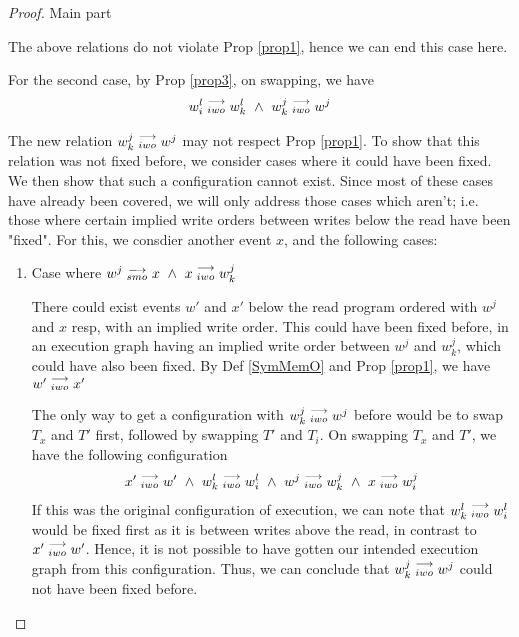 \begin{proof}{Main part}
\begin{itemize}
                        The above relations do not violate Prop \ref{prop1}, hence we can end this case here. 

                        For the second case, by Prop \ref{prop3}, on swapping, we have 
                        \begin{align*}
                            \reln{w_i^l}{iwo}{w_k^l} \ \wedge \ \reln{w_k^j}{iwo}{w^j}
                        \end{align*}

                        The new relation $w_k^j\stackrel{\longrightarrow}{_{iwo}}w^j$ may not respect Prop \ref{prop1}. 
                        To show that this relation was not fixed before, we consider cases where it could have been fixed. We then show that such a configuration cannot exist. Since most of these cases have already been covered, we will only address those cases which aren't; i.e. those where certain implied write orders between writes below the read have been "fixed". For this, we consdier another event $x$, and the following cases:

                        \begin{enumerate}
                            \item Case where $w^j\stackrel{\longrightarrow}{_{smo}}x \ \wedge \ x\stackrel{\longrightarrow}{_{iwo}}w_k^j$
                                
                                There could exist events $w'$ and $x'$ below the read program ordered with $w^j$ and $x$ resp, with an implied write order. This could have been fixed before, in an execution graph having an implied write order between $w^j$ and $w_k^j$, which could have also been fixed.
                                By Def \ref{SymMemO} and Prop \ref{prop1}, we have $w'\stackrel{\longrightarrow}{_{iwo}}x'$

                                The only way to get a configuration with $w_k^j\stackrel{\longrightarrow}{_{iwo}}w^j$ before would be to swap $T_x$ and $T'$ first, followed by swapping $T'$ and $T_i$. 
                                On swapping $T_x$ and $T'$, we have the following configuration 
                                \begin{align*}
                                    \reln{x'}{iwo}{w'} \ \wedge \ \reln{w_k^l}{iwo}{w_i^l} \ \wedge \ \reln{w^j}{iwo}{w_k^j} \ \wedge \ \reln{x}{iwo}{w_i^j} 
                                \end{align*}
                                If this was the original configuration of execution, we can note that $w_k^l\stackrel{\longrightarrow}{_{iwo}}w_i^l$ would be fixed first as it is between writes above the read, in contrast to $x'\stackrel{\longrightarrow}{_{iwo}}w'$. Hence, it is not possible to have gotten our intended execution graph from this configuration. Thus, we can conclude that $w_k^j\stackrel{\longrightarrow}{_{iwo}}w^j$ could not have been fixed before.  
                             

\end{enumerate}
\end{itemize}
\end{proof}
